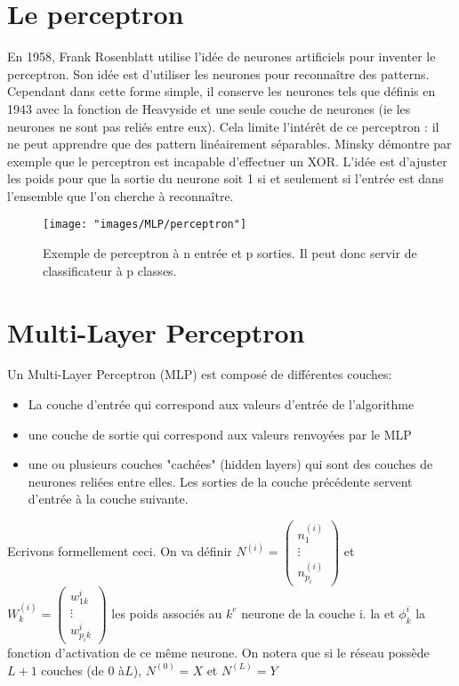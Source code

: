 \section{Le perceptron}
En 1958, Frank Rosenblatt utilise l'idée de neurones artificiels pour inventer le perceptron. Son idée est d'utiliser les neurones pour reconnaître des patterns. Cependant dans cette forme simple, il conserve les neurones tels que définis en 1943 avec la fonction de Heavyside et une seule couche de neurones (ie les neurones ne sont pas reliés entre eux). Cela limite l'intérêt de ce perceptron : il ne peut apprendre que des pattern linéairement séparables. Minsky démontre par exemple que le perceptron est incapable d'effectuer un XOR.
L'idée est d'ajuster les poids pour que la sortie du neurone soit 1 si et seulement si l'entrée est dans l'ensemble que l'on cherche à reconnaître. 

\begin{figure}[!h]
\centering
\texttt{[image: "images/MLP/perceptron"]}
\caption{Exemple de perceptron à n entrée et p sorties. Il peut donc servir de classificateur à p classes.}
\label{perceptron}
\end{figure}

\section{Multi-Layer Perceptron}
Un Multi-Layer Perceptron (MLP) est composé de différentes couches: \begin{itemize}
\item La couche d'entrée qui correspond aux valeurs d'entrée de l'algorithme
\item une couche de sortie qui correspond aux valeurs renvoyées par le MLP
\item une ou plusieurs couches "cachées" (hidden layers) qui sont des couches de neurones reliées entre elles. Les sorties de la couche précédente servent d'entrée à la couche suivante.

\end{itemize}

Ecrivons formellement ceci. On va définir $N^(i)  = \begin{pmatrix} n_1^(i)\\ \vdots \\ n_{p_i}^(i) \end{pmatrix}$  et 
$W_k^(i) = \begin{pmatrix} w_{1k}^i\\ \vdots \\ w_{p_ik}^i \end{pmatrix}$ les poids associés au $k^e$ neurone de la couche i. la  et $\phi_k^i$ la fonction d'activation de ce même neurone. 
On notera que si le réseau possède $L+1$ couches (de $0$ à$ L$), $N^(0) = X$ et $N^(L) = Y$


